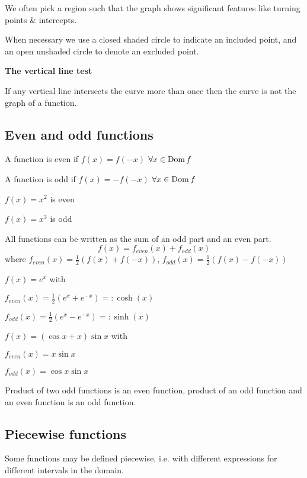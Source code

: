 \documentclass[10pt, a4paper]{article}
\begin{document}
We often pick a region such that the graph shows significant features like turning points \& intercepts.

When necessary we use a closed shaded circle to indicate an included point, and an open unshaded circle to denote an excluded point.

\textbf{The vertical line test}

If any vertical line intersects the curve more than once then the curve is not the graph of a function.

\subsection{Even and odd functions}
\begin{definition}
    A function is even if $f(x) = f(-x)$ $\forall x \in \operatorname{Dom} f$
    
    A function is odd if $f(x) = -f(-x)$ $\forall x \in \operatorname{Dom} f$
\end{definition}
\begin{example}
    $f(x) = x ^ 2$ is even

    $f(x) = x ^ 3$ is odd
\end{example}

All functions can be written as the sum of an odd part and an even part.
\[
f(x) = f_{even}(x) + f_{odd}(x)
\]
where $f_{even}(x) = \frac{1}{2}\left(f(x) + f(-x)\right)$,
$f_{odd}(x) = \frac{1}{2}\left(f(x) - f(-x)\right)$

\begin{example}
    $f(x) = e ^ x$ with
    
    $f_{even}(x) = \frac{1}{2}(e ^ x + e ^ {-x}) =: \cosh(x)$
    
    $f_{odd}(x) = \frac{1}{2}(e ^ x - e ^ {-x}) =: \sinh(x)$
\end{example}

\begin{example}
    $f(x) = (\cos x + x)\sin x$ with

    $f_{even}(x) = x\sin x$
    
    $f_{odd}(x) = \cos x \sin x$
\end{example}

Product of two odd functions is an even function, product of an odd function and an even function is an odd function.

\subsection{Piecewise functions}
Some functions may be defined piecewise, i.e. with different expressions for different intervals in the domain.
\end{document}
